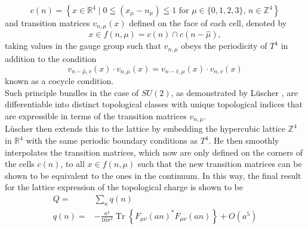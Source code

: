 \documentclass[a4paper,10pt]{book}
\begin{document}
\begin{equation}
c(n)=\left\{x \in \mathbb{R}^{4} \mid 0 \leqq\left(x_{\mu}-n_{\mu}\right) \leqq 1 \text { for } \mu\in\{0,1,2,3\},\,n \in \mathbb{Z}^{4}\right\}
\end{equation}
and transition matrices $v_{n,\mu}(x)$ defined on the face of each cell, denoted by
\begin{equation}
x\in f(n,\mu) = c(n) \cap c(n-\hat{\mu}),
\end{equation}
taking values in the gauge group such that $v_{n,\mu}$ obeys the periodicity of $T^4$ in addition to the condition 
\begin{equation}
v_{n-\hat{\mu}, v}(x) \cdot v_{n, \mu}(x)=v_{n-\hat{v}, \mu}(x) \cdot v_{n, v}(x)
\end{equation}
known as a cocycle condition.\\
Such principle bundles in the case of $SU(2)$, as demonstrated by Lüscher \cite{L_scherM1982Tolg}, are differentiable into distinct topological classes with unique topological indices that are expressible in terms of the transition matrices $v_{n,\mu}$.\\Lüscher then extends this to the lattice by embedding the hypercubic lattice $\mathbb{Z}^{4}$ in $\mathbb{R}^{4}$ with the same periodic boundary conditions as $T^4$. He then smoothly interpolates the transition matrices, which now are only defined on the corners of the cells $c(n)$, to all $x\in f(n,\mu)$ such that the new transition matrices can be shown to be equivalent to the ones in the continuum. In this way, the final result for the lattice expression of the topological charge is shown to be
\begin{equation}
\begin{aligned} 
Q=&\sum_{n} q(n)\\
q(n)=&-\frac{a^{4}}{16 \pi^{2}} \operatorname{Tr}\left\{F_{\mu \nu}(a n) ^* F_{\mu \nu}(a n)\right\}+O\left(a^{5}\right)
\end{aligned}
\end{equation}
\end{document}
